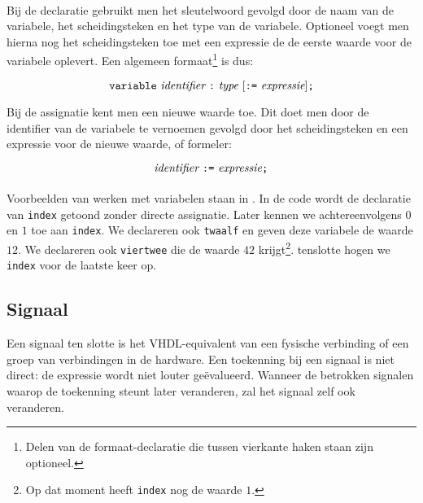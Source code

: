 \paragraph{}
Bij de declaratie gebruikt men het sleutelwoord  gevolgd door de naam van de variabele, het \vhdltermen{:} scheidingsteken en het type van de variabele. Optioneel voegt men hierna nog het \vhdltermen{:=} scheidingsteken toe met een expressie de de eerste waarde voor de variabele oplevert. Een algemeen formaat\footnote{Delen van de formaat-declaratie die tussen vierkante haken staan zijn optioneel.} is dus:

\begin{equation}%
\vhdltermen{variable}\ \textit{identifier}\ \vhdltermen{:}\ \textit{type}\ [\vhdltermen{:=}\ \textit{expressie}]\vhdltermen{;}
\end{equation}

Bij de assignatie kent men een nieuwe waarde toe. Dit doet men door de identifier van de variabele te vernoemen gevolgd door het \vhdltermen{:=} scheidingsteken en een expressie voor de nieuwe waarde, of formeler:

\begin{equation}%
\textit{identifier}\ \vhdltermen{:=}\ \textit{expressie}\vhdltermen{;}
\end{equation}

\paragraph{}
Voorbeelden van werken met variabelen staan in . In de code wordt de declaratie van \texttt{index} getoond zonder directe assignatie. Later kennen we achtereenvolgens $0$ en $1$ toe aan \texttt{index}. We declareren ook \texttt{twaalf} en geven deze variabele de waarde $12$. We declareren ook \texttt{viertwee} die de waarde $42$ krijgt\footnote{Op dat moment heeft \texttt{index} nog de waarde $1$.}. tenslotte hogen we \texttt{index} voor de laatste keer op.


\subsection{Signaal}
Een signaal ten slotte is het VHDL-equivalent van een fysische verbinding of een groep van verbindingen in de hardware. Een toekenning bij een signaal is niet direct: de expressie wordt niet louter ge\"evalueerd. Wanneer de betrokken signalen waarop de toekenning steunt later veranderen, zal het signaal zelf ook veranderen.

